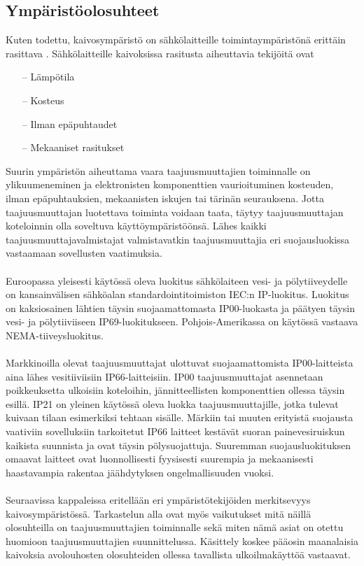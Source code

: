 \documentclass[finnish,12pt,a4paper,pdftex,elec,utf8]{aaltothesis}
\begin{document}
\subsection{Ympäristöolosuhteet}
Kuten todettu, kaivosympäristö on sähkölaitteille toimintaympäristönä erittäin rasittava \cite[s. 251]{Hakapää}. %
Sähkölaitteille kaivoksissa rasitusta aiheuttavia tekijöitä ovat
\begin{itemize}
	\item[--] Lämpötila
	\item[--] Kosteus
	\item[--] Ilman epäpuhtaudet
	\item[--] Mekaaniset rasitukset
\end{itemize}
Suurin ympäristön aiheuttama vaara taajuusmuuttajien toiminnalle on ylikuumeneminen ja elektronisten komponenttien vaurioituminen kosteuden, ilman  epäpuhtauksien, mekaanisten iskujen tai tärinän seurauksena. Jotta taajuusmuuttajan luotettava toiminta voidaan taata, täytyy taajuusmuuttajan koteloinnin olla soveltuva käyttöympäristöönsä. Lähes kaikki taajuusmuuttajavalmistajat valmistavatkin taajuusmuuttajia eri suojausluokissa vastaamaan sovellusten vaatimuksia.
\\\\
Euroopassa yleisesti käytössä oleva luokitus sähkölaiteen vesi- ja pölytiiveydelle on kansainvälisen sähköalan standardointitoimiston IEC:n IP-luokitus. Luokitus on kaksiosainen lähtien täysin suojaamattomasta IP00-luokasta ja päätyen täysin vesi- ja pölytiiviiseen IP69-luokitukseen. %
Pohjois-Amerikassa on käytössä vastaava NEMA-tiiveysluokitus.
\\\\
Markkinoilla olevat taajuusmuuttajat ulottuvat suojaamattomista IP00-laitteista aina lähes vesitiiviisiin IP66-laitteisiin. IP00 taajuusmuuttajat asennetaan poikkeuksetta ulkoisiin koteloihin, jännitteellisten komponenttien ollessa täysin esillä. IP21 on yleinen käytössä oleva luokka taajuusmuuttajille, jotka tulevat kuivaan tilaan esimerkiksi tehtaan sisälle. Märkiin tai muuten erityistä suojausta vaativiin sovelluksiin tarkoitetut IP66 laitteet kestävät suoran painevesiruiskun kaikista suunnista ja ovat täysin pölysuojattuja. Suuremman suojausluokituksen omaavat laitteet ovat luonnollisesti fyysisesti suurempia ja mekaanisesti haastavampia rakentaa jäähdytyksen ongelmallisuuden vuoksi.
\\\\
Seuraavissa kappaleissa eritellään eri ympäristötekijöiden merkitsevyys kaivosympäristössä. Tarkastelun alla ovat myös vaikutukset mitä näillä olosuhteilla on taajuusmuuttajien toiminnalle sekä miten nämä asiat on otettu huomioon taajuusmuuttajien suunnittelussa. Käsittely koskee pääosin maanalaisia kaivoksia avolouhosten olosuhteiden ollessa tavallista ulkoilmakäyttöä vastaavat. %
\end{document}

